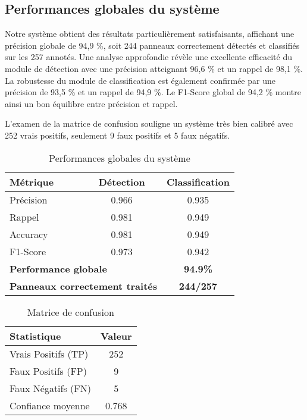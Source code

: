 \documentclass[journal]{IEEEtran}
\begin{document}
\subsection{Performances globales du système}

Notre système obtient des résultats particulièrement satisfaisants, affichant une précision globale de 94,9 \%, soit 244 panneaux correctement détectés et classifiés sur les 257 annotés. Une analyse approfondie révèle une excellente efficacité du module de détection avec une précision atteignant 96,6 \% et un rappel de 98,1 \%. La robustesse du module de classification est également confirmée par une précision de 93,5 \% et un rappel de 94,9 \%. Le F1-Score global de 94,2 \% montre ainsi un bon équilibre entre précision et rappel.

L'examen de la matrice de confusion souligne un système très bien calibré avec 252 vrais positifs, seulement 9 faux positifs et 5 faux négatifs.

\begin{table}[htbp]
\centering
\caption{Performances globales du système}
\label{tab:performances_globales}
\begin{tabular}{|l|c|c|}
\hline
\textbf{Métrique} & \textbf{Détection} & \textbf{Classification} \\
\hline
Précision & 0.966 & 0.935 \\
Rappel & 0.981 & 0.949 \\
Accuracy & 0.981 & 0.949 \\
F1-Score & 0.973 & 0.942 \\
\hline
\hline
\multicolumn{2}{|l|}{\textbf{Performance globale}} & \textbf{94.9\%} \\
\multicolumn{2}{|l|}{\textbf{Panneaux correctement traités}} & \textbf{244/257} \\
\hline
\end{tabular}
\end{table}

\begin{table}[htbp]
\centering
\caption{Matrice de confusion}
\label{tab:confusion}
\begin{tabular}{|l|c|}
\hline
\textbf{Statistique} & \textbf{Valeur} \\
\hline
Vrais Positifs (TP) & 252 \\
Faux Positifs (FP) & 9 \\
Faux Négatifs (FN) & 5 \\
\hline
\hline
Confiance moyenne & 0.768 \\
\hline
\end{tabular}
\end{table}
\end{document}

